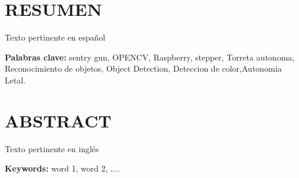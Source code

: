 \newpage

%
%

\section*{RESUMEN}
Texto pertinente en español

\textbf{Palabras clave:} sentry gun, OPENCV, Raspberry, stepper, Torreta autonoma, Reconocimiento de objetos, Object Detection, Deteccion de color,Autonomia Letal.

\newpage

%
%

\section*{ABSTRACT}
Texto pertinente en inglés 

\textbf{Keywords:} word 1, word 2, ....
